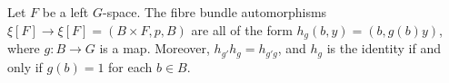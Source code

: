 Let $F$ be a left $G$-space. The fibre bundle automorphisms $\xi[F] \rightarrow \xi[F] = (B \times F, p, B)$ are all of the form $h_g(b, y) = (b, g(b)y)$, where $g: B \rightarrow G$ is a map. Moreover, $h_{g'}h_g = h_{g'g}$, and $h_g$ is the identity if and only if $g(b) = 1$ for each $b \in B$.
